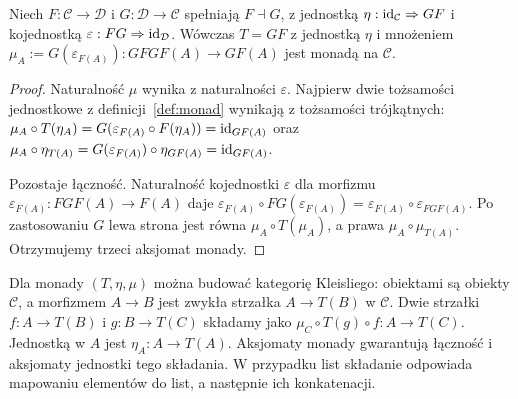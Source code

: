 \begin{twierdzenie}
Niech $F:\mathcal C\to\mathcal D$ i $G:\mathcal D\to\mathcal C$ spełniają $F\dashv G$, z jednostką $\eta:\mathrm{id}_{\mathcal C}\Rightarrow GF$ i kojednostką $\varepsilon:FG\Rightarrow\mathrm{id}_{\mathcal D}$. Wówczas $T=GF$ z jednostką $\eta$ i mnożeniem $\mu_A:=G(\varepsilon_{F(A)}):GFGF(A)\to GF(A)$ jest monadą na $\mathcal C$.
\end{twierdzenie}
\begin{proof}
Naturalność $\mu$ wynika z naturalności $\varepsilon$. Najpierw dwie tożsamości jednostkowe z definicji~\ref{def:monad} wynikają z tożsamości trójkątnych:
$\mu_A\circ T(\eta_A)=G(\varepsilon_{F(A)}\circ F(\eta_A))=\mathrm{id}_{GF(A)}$ oraz
$\mu_A\circ\eta_{T(A)}=G(\varepsilon_{F(A)})\circ\eta_{GF(A)}=\mathrm{id}_{GF(A)}$.

Pozostaje łączność. Naturalność kojednostki $\varepsilon$ dla morfizmu $\varepsilon_{F(A)}:FGF(A)\to F(A)$ daje
$\varepsilon_{F(A)}\circ FG(\varepsilon_{F(A)})=\varepsilon_{F(A)}\circ\varepsilon_{FGF(A)}$. Po zastosowaniu $G$ lewa strona jest równa $\mu_A\circ T(\mu_A)$, a prawa $\mu_A\circ\mu_{T(A)}$. Otrzymujemy trzeci aksjomat monady.
\end{proof}

\begin{uwaga}
Dla monady $(T,\eta,\mu)$ można budować kategorię Kleisliego: obiektami są obiekty $\mathcal C$, a morfizmem $A\to B$ jest zwykła strzałka $A\to T(B)$ w $\mathcal C$. Dwie strzałki $f:A\to T(B)$ i $g:B\to T(C)$ składamy jako $\mu_C\circ T(g)\circ f:A\to T(C)$. Jednostką w $A$ jest $\eta_A:A\to T(A)$. Aksjomaty monady gwarantują łączność i aksjomaty jednostki tego składania. W przypadku list składanie odpowiada mapowaniu elementów do list, a następnie ich konkatenacji.
\end{uwaga}

